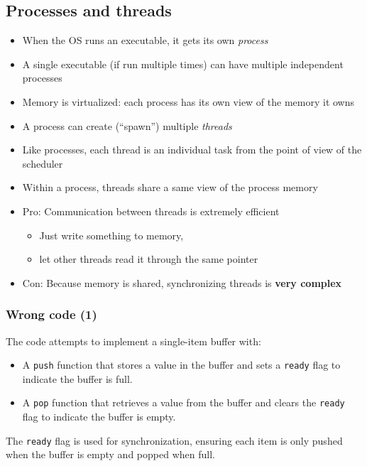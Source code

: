 \documentclass[12pt]{article}
\begin{document}
\subsection{Processes and threads}
\begin{itemize}
    \item When the OS runs an executable, it gets its own \textit{process}
    \item A single executable (if run multiple times) can have multiple independent processes
    \item Memory is virtualized: each process has its own view of the memory it owns
    \item A process can create (“spawn”) multiple \textit{threads}
    \item Like processes, each thread is an individual task from the point of view of the scheduler
    \item Within a process, threads share a same view of the process memory
\end{itemize}

\begin{itemize}
    \item Pro: Communication between threads is extremely efficient
    \begin{itemize}
        \item Just write something to memory,
        \item let other threads read it through the same pointer
    \end{itemize}
    
    \item Con: Because memory is shared, synchronizing threads is \textbf{very complex}
\end{itemize}

\subsubsection{Wrong code (1)}

The code attempts to implement a single-item buffer with:
\begin{itemize}
  \item A \texttt{push} function that stores a value in the buffer and sets a \texttt{ready} flag to indicate the buffer is full.
  \item A \texttt{pop} function that retrieves a value from the buffer and clears the \texttt{ready} flag to indicate the buffer is empty.
\end{itemize}
The \texttt{ready} flag is used for synchronization, ensuring each item is only pushed when the buffer is empty and popped when full.
\end{document}
